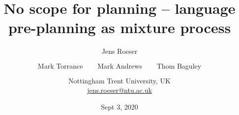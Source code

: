 \documentclass{slides}
\title[]{ No scope for planning -- language pre-planning as mixture process }
\author{\small Jens Roeser \\ $\phantom{foo}$ \\ Mark Torrance $\phantom{foo}$ Mark Andrews $\phantom{foo}$ Thom Baguley \\$\phantom{foo}$ \\ Nottingham Trent University, UK \\ \url{jens.roeser@ntu.ac.uk} }
\institute{26th AMLaP, University of Potsdam}
\date{Sept 3, 2020}
\begin{document}
\frame{\titlepage}

	
	
	
	
	
	
	
	
		
	
	
	
	
	
	
	
\end{document}
